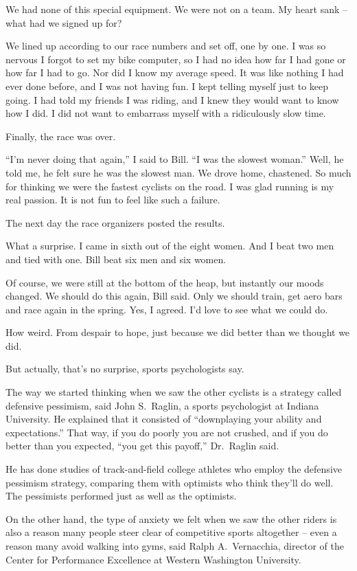 ﻿\documentclass[12pt]{article}
\begin{document}
We had none of this special equipment. We were not on a team. My heart sank -- what had we signed up
for?

We lined up according to our race numbers and set off, one by one. I was so nervous I forgot to set
my bike computer, so I had no idea how far I had gone or how far I had to go. Nor did I know my
average speed. It was like nothing I had ever done before, and I was not having fun. I kept telling
myself just to keep going. I had told my friends I was riding, and I knew they would want to know
how I did. I did not want to embarrass myself with a ridiculously slow time.

Finally, the race was over.

``I'm never doing that again,'' I said to Bill. ``I was the slowest woman.'' Well, he told me, he
felt sure he was the slowest man. We drove home, chastened. So much for thinking we were the fastest
cyclists on the road. I was glad running is my real passion. It is not fun to feel like such a
failure.

The next day the race organizers posted the results.

What a surprise. I came in sixth out of the eight women. And I beat two men and tied with one. Bill
beat six men and six women.

Of course, we were still at the bottom of the heap, but instantly our moods changed. We should do
this again, Bill said. Only we should train, get aero bars and race again in the spring. Yes, I
agreed. I'd love to see what we could do.

How weird. From despair to hope, just because we did better than we thought we did.

But actually, that's no surprise, sports psychologists say.

The way we started thinking when we saw the other cyclists is a strategy called defensive pessimism,
said John S.~Raglin, a sports psychologist at Indiana University. He explained that it consisted of
``downplaying your ability and expectations.'' That way, if you do poorly you are not crushed, and
if you do better than you expected, ``you get this payoff,'' Dr.~Raglin said.

He has done studies of track-and-field college athletes who employ the defensive pessimism strategy,
comparing them with optimists who think they'll do well. The pessimists performed just as well as
the optimists.

On the other hand, the type of anxiety we felt when we saw the other riders is also a reason many
people steer clear of competitive sports altogether -- even a reason many avoid walking into gyms,
said Ralph A.~Vernacchia, director of the Center for Performance Excellence at Western Washington
University.
\end{document}
